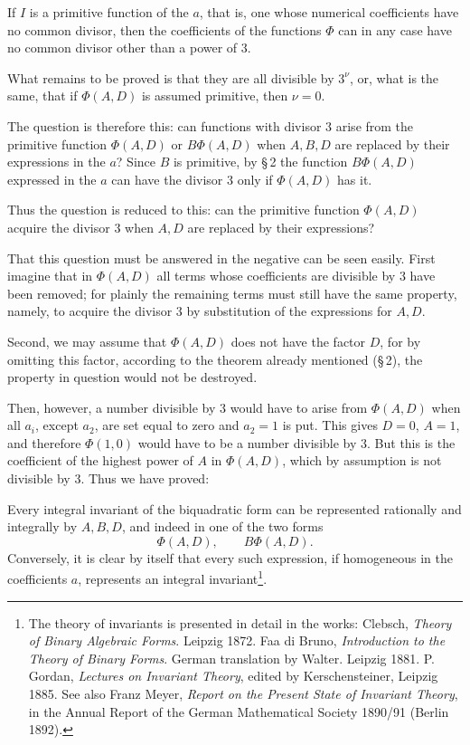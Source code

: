 \documentclass[11pt]{article}
\begin{document}
If $I$ is a primitive function of the $a$, that is, one whose numerical coefficients have no common divisor, then the coefficients of the functions $\Phi$ can in any case have no common divisor other than a power of $3$.

What remains to be proved is that they are all divisible by $3^\nu$, or, what is the same, that if $\Phi(A,D)$ is assumed primitive, then $\nu=0$.

The question is therefore this: can functions with divisor $3$ arise from the primitive function $\Phi(A,D)$ or $B\Phi(A,D)$ when $A,B,D$ are replaced by their expressions in the $a$? Since $B$ is primitive, by \S\,2 the function $B\Phi(A,D)$ expressed in the $a$ can have the divisor $3$ only if $\Phi(A,D)$ has it.

Thus the question is reduced to this: can the primitive function $\Phi(A,D)$ acquire the divisor $3$ when $A,D$ are replaced by their expressions?

That this question must be answered in the negative can be seen easily. First imagine that in $\Phi(A,D)$ all terms whose coefficients are divisible by $3$ have been removed; for plainly the remaining terms must still have the same property, namely, to acquire the divisor $3$ by substitution of the expressions for $A,D$.

Second, we may assume that $\Phi(A,D)$ does not have the factor $D$, for by omitting this factor, according to the theorem already mentioned (\S\,2), the property in question would not be destroyed.

Then, however, a number divisible by $3$ would have to arise from $\Phi(A,D)$ when all $a_i$, except $a_2$, are set equal to zero and $a_2=1$ is put. This gives $D=0$, $A=1$, and therefore $\Phi(1,0)$ would have to be a number divisible by $3$. But this is the coefficient of the highest power of $A$ in $\Phi(A,D)$, which by assumption is not divisible by $3$. Thus we have proved:

Every integral invariant of the biquadratic form can be represented rationally and integrally by $A,B,D$, and indeed in one of the two forms
\[
 \Phi(A,D),
 \qquad
 B\Phi(A,D).
\]
Conversely, it is clear by itself that every such expression, if homogeneous in the coefficients $a$, represents an integral invariant\footnote{The theory of invariants is presented in detail in the works: Clebsch, \emph{Theory of Binary Algebraic Forms}. Leipzig 1872. Faa di Bruno, \emph{Introduction to the Theory of Binary Forms}. German translation by Walter. Leipzig 1881. P. Gordan, \emph{Lectures on Invariant Theory}, edited by Kerschensteiner, Leipzig 1885. See also Franz Meyer, \emph{Report on the Present State of Invariant Theory}, in the Annual Report of the German Mathematical Society 1890/91 (Berlin 1892).}.
\end{document}
